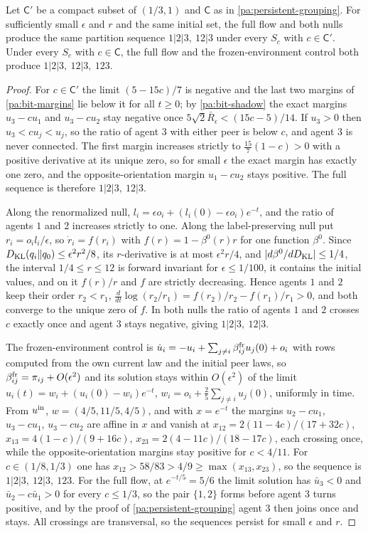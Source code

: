 Let $\mathsf C'$ be a compact subset of $(1/3,1)$ and $\mathsf C$ as in \cref{pa:persistent-grouping}. For sufficiently small $\epsilon$ and $r$ and the same initial set, the full flow and both nulls produce the same partition sequence $1|2|3,\ 12|3$ under every $S_c$ with $c\in\mathsf C'$. Under every $S_c$ with $c\in\mathsf C$, the full flow and the frozen-environment control both produce $1|2|3,\ 12|3,\ 123$.
\begin{proof}
For $c\in\mathsf C'$ the limit $(5-15c)/7$ is negative and the last two margins of \cref{pa:bit-margins} lie below it for all $t\geq0$; by \cref{pa:bit-shadow} the exact margins $u_3-cu_1$ and $u_3-cu_2$ stay negative once $5\sqrt2\bar R_\epsilon<(15c-5)/14$. If $u_3>0$ then $u_3<cu_j<u_j$, so the ratio of agent $3$ with either peer is below $c$, and agent $3$ is never connected. The first margin increases strictly to $\tfrac{15}7(1-c)>0$ with a positive derivative at its unique zero, so for small $\epsilon$ the exact margin has exactly one zero, and the opposite-orientation margin $u_1-cu_2$ stays positive. The full sequence is therefore $1|2|3,\ 12|3$.

Along the renormalized null, $l_i=\epsilon o_i+(l_i(0)-\epsilon o_i)e^{-t}$, and the ratio of agents $1$ and $2$ increases strictly to one. Along the label-preserving null put $r_i=o_il_i/\epsilon$, so $\dot r_i=f(r_i)$ with $f(r)=1-\beta^0(r)r$ for one function $\beta^0$. Since $D_{\mathrm{KL}}(q_i\Vert q_0)\leq\epsilon^2r^2/8$, its $r$-derivative is at most $\epsilon^2r/4$, and $|d\beta^0/dD_{\mathrm{KL}}|\leq1/4$, the interval $1/4\leq r\leq12$ is forward invariant for $\epsilon\leq1/100$, it contains the initial values, and on it $f(r)/r$ and $f$ are strictly decreasing. Hence agents $1$ and $2$ keep their order $r_2<r_1$, $\frac{d}{dt}\log(r_2/r_1)=f(r_2)/r_2-f(r_1)/r_1>0$, and both converge to the unique zero of $f$. In both nulls the ratio of agents $1$ and $2$ crosses $c$ exactly once and agent $3$ stays negative, giving $1|2|3,\ 12|3$.

The frozen-environment control is $\dot u_i=-u_i+\sum_{j\ne i}\beta^{\rm fr}_{ij}u_j(0)+o_i$ with rows computed from the own current law and the initial peer laws, so $\beta^{\rm fr}_{ij}=\pi_{ij}+O(\epsilon^2)$ and its solution stays within $O(\epsilon^2)$ of the limit $u_i(t)=w_i+(u_i(0)-w_i)e^{-t}$, $w_i=o_i+\tfrac25\sum_{j\ne i}u_j(0)$, uniformly in time. From $u^{\rm in}$, $w=(4/5,11/5,4/5)$, and with $x=e^{-t}$ the margins $u_2-cu_1$, $u_3-cu_1$, $u_3-cu_2$ are affine in $x$ and vanish at $x_{12}=2(11-4c)/(17+32c)$, $x_{13}=4(1-c)/(9+16c)$, $x_{23}=2(4-11c)/(18-17c)$, each crossing once, while the opposite-orientation margins stay positive for $c<4/11$. For $c\in(1/8,1/3)$ one has $x_{12}>58/83>4/9\geq\max(x_{13},x_{23})$, so the sequence is $1|2|3,\ 12|3,\ 123$. For the full flow, at $e^{-t/5}=5/6$ the limit solution has $\bar u_3<0$ and $\bar u_2-c\bar u_1>0$ for every $c\leq1/3$, so the pair $\{1,2\}$ forms before agent $3$ turns positive, and by the proof of \cref{pa:persistent-grouping} agent $3$ then joins once and stays. All crossings are transversal, so the sequences persist for small $\epsilon$ and $r$.
\end{proof}

